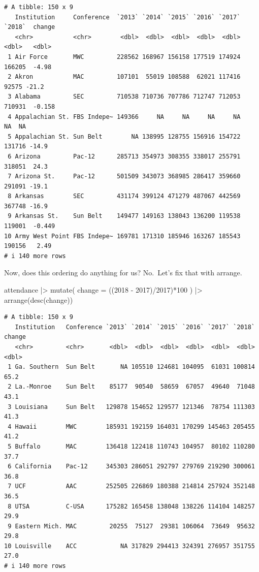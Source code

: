 \documentclass[
  letterpaper,
  DIV=11,
  numbers=noendperiod]{scrreprt}
\newenvironment{Shaded}{\begin{snugshade}}{\end{snugshade}}
\newcommand{\AttributeTok}[1]{\textcolor[rgb]{0.40,0.45,0.13}{#1}}
\newcommand{\DecValTok}[1]{\textcolor[rgb]{0.68,0.00,0.00}{#1}}
\newcommand{\FunctionTok}[1]{\textcolor[rgb]{0.28,0.35,0.67}{#1}}
\newcommand{\NormalTok}[1]{\textcolor[rgb]{0.00,0.23,0.31}{#1}}
\newcommand{\SpecialCharTok}[1]{\textcolor[rgb]{0.37,0.37,0.37}{#1}}
\newcommand{\StringTok}[1]{\textcolor[rgb]{0.13,0.47,0.30}{#1}}
\begin{document}
\begin{verbatim}
# A tibble: 150 x 9
   Institution     Conference  `2013` `2014` `2015` `2016` `2017` `2018`  change
   <chr>           <chr>        <dbl>  <dbl>  <dbl>  <dbl>  <dbl>  <dbl>   <dbl>
 1 Air Force       MWC         228562 168967 156158 177519 174924 166205  -4.98 
 2 Akron           MAC         107101  55019 108588  62021 117416  92575 -21.2  
 3 Alabama         SEC         710538 710736 707786 712747 712053 710931  -0.158
 4 Appalachian St. FBS Indepe~ 149366     NA     NA     NA     NA     NA  NA    
 5 Appalachian St. Sun Belt        NA 138995 128755 156916 154722 131716 -14.9  
 6 Arizona         Pac-12      285713 354973 308355 338017 255791 318051  24.3  
 7 Arizona St.     Pac-12      501509 343073 368985 286417 359660 291091 -19.1  
 8 Arkansas        SEC         431174 399124 471279 487067 442569 367748 -16.9  
 9 Arkansas St.    Sun Belt    149477 149163 138043 136200 119538 119001  -0.449
10 Army West Point FBS Indepe~ 169781 171310 185946 163267 185543 190156   2.49 
# i 140 more rows
\end{verbatim}

Now, does this ordering do anything for us? No.~Let's fix that with
arrange.

\begin{Shaded}
\begin{Highlighting}[]
\NormalTok{attendance }\SpecialCharTok{|\textgreater{}} \FunctionTok{mutate}\NormalTok{(}
  \AttributeTok{change =}\NormalTok{ ((}\StringTok{\textasciigrave{}}\AttributeTok{2018}\StringTok{\textasciigrave{}} \SpecialCharTok{{-}} \StringTok{\textasciigrave{}}\AttributeTok{2017}\StringTok{\textasciigrave{}}\NormalTok{)}\SpecialCharTok{/}\StringTok{\textasciigrave{}}\AttributeTok{2017}\StringTok{\textasciigrave{}}\NormalTok{)}\SpecialCharTok{*}\DecValTok{100}
\NormalTok{) }\SpecialCharTok{|\textgreater{}} \FunctionTok{arrange}\NormalTok{(}\FunctionTok{desc}\NormalTok{(change))}
\end{Highlighting}
\end{Shaded}

\begin{verbatim}
# A tibble: 150 x 9
   Institution   Conference `2013` `2014` `2015` `2016` `2017` `2018` change
   <chr>         <chr>       <dbl>  <dbl>  <dbl>  <dbl>  <dbl>  <dbl>  <dbl>
 1 Ga. Southern  Sun Belt       NA 105510 124681 104095  61031 100814   65.2
 2 La.-Monroe    Sun Belt    85177  90540  58659  67057  49640  71048   43.1
 3 Louisiana     Sun Belt   129878 154652 129577 121346  78754 111303   41.3
 4 Hawaii        MWC        185931 192159 164031 170299 145463 205455   41.2
 5 Buffalo       MAC        136418 122418 110743 104957  80102 110280   37.7
 6 California    Pac-12     345303 286051 292797 279769 219290 300061   36.8
 7 UCF           AAC        252505 226869 180388 214814 257924 352148   36.5
 8 UTSA          C-USA      175282 165458 138048 138226 114104 148257   29.9
 9 Eastern Mich. MAC         20255  75127  29381 106064  73649  95632   29.8
10 Louisville    ACC            NA 317829 294413 324391 276957 351755   27.0
# i 140 more rows
\end{verbatim}
\end{document}
